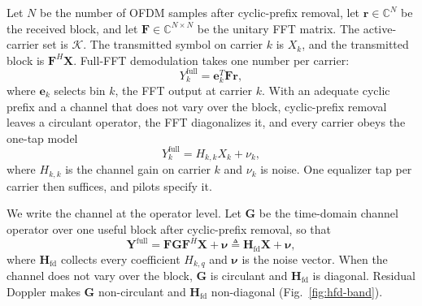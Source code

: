 \documentclass[conference]{IEEEtran}
\newcommand{\C}{\mathbb{C}}
\newcommand{\Kset}{\mathcal{K}}
\begin{document}
Let \(N\) be the number of OFDM samples after cyclic-prefix removal, let
\(\mathbf r\in\C^N\) be the received block, and let
\(\mathbf F\in\C^{N\times N}\) be the unitary FFT matrix.  The active-carrier
set is \(\Kset\).  The transmitted symbol on carrier \(k\) is
\(X_k\), and the transmitted block is \(\mathbf F^H\mathbf X\).  Full-FFT
demodulation takes one number per carrier:
\begin{equation}
  Y_k^{\mathrm{full}}
  =
  \mathbf e_k^{T}\mathbf F\mathbf r,
  \label{eq:full-fft-bin}
\end{equation}
where \(\mathbf e_k\) selects bin \(k\), the FFT output at carrier
\(k\).  With an adequate cyclic prefix and a channel that does not vary over the
block, cyclic-prefix removal leaves a circulant operator, the FFT
diagonalizes it, and every carrier obeys the one-tap model
\begin{equation}
  Y_k^{\mathrm{full}}
  =
  H_{k,k}X_k+\nu_k,
  \label{eq:one-tap}
\end{equation}
where \(H_{k,k}\) is the channel gain on carrier \(k\) and \(\nu_k\) is
noise.
One equalizer tap per carrier then suffices, and pilots specify it.

We write the channel at the operator level.  Let \(\mathbf G\)
be the time-domain channel operator over one useful block after
cyclic-prefix removal, so that
\begin{equation}
  \mathbf Y^{\mathrm{full}}
  =
  \mathbf F\mathbf G\mathbf F^{H}\mathbf X+\bm\nu
  \triangleq
  \mathbf H_{\mathrm{fd}}\mathbf X+\bm\nu,
  \label{eq:fd-operator}
\end{equation}
where \(\mathbf H_{\mathrm{fd}}\) collects every coefficient
\(H_{k,q}\) and \(\bm\nu\) is the noise vector.  When the channel does
not vary over the block, \(\mathbf G\) is circulant and
\(\mathbf H_{\mathrm{fd}}\) is diagonal.  Residual Doppler makes
\(\mathbf G\) non-circulant and \(\mathbf H_{\mathrm{fd}}\)
non-diagonal (Fig.~\ref{fig:hfd-band}).
\end{document}
